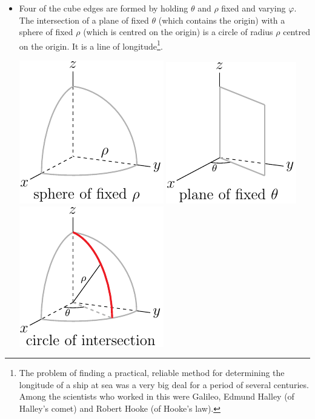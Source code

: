 \begin{itemize}
\item 
Four of the cube edges are formed by holding $\theta$ and $\rho$
fixed and varying $\varphi$. The intersection of a plane of fixed $\theta$
(which contains the origin) with a sphere of fixed $\rho$ 
(which is centred on the origin) is a circle of radius $\rho$ centred
on the origin. It is a line of longitude\footnote{The problem of finding
a practical, reliable method for determining the longitude of a ship
at sea was a very big deal for a period of several centuries.
Among the scientists who worked in this were Galileo, 
Edmund Halley (of Halley's comet) and Robert Hooke (of Hooke's law). 
}. 
\begin{efig}
\begin{center}
     \includegraphics{sphereRho.pdf}\quad
     \includegraphics{sphereTh.pdf}\quad
     \includegraphics{sphereRhoThB.pdf}

\end{center}
\end{efig}
\end{itemize}
